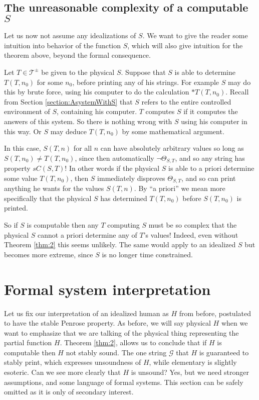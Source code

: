 \documentclass{amsart}  %
\numberwithin{equation}{section}
\theoremstyle{definition}
\theoremstyle{remark}
\begin{document}
{\subsection{The unreasonable complexity of a computable $S$} Let us now not assume any idealizations of $S$. We want to give the reader some intuition into behavior of the function $S$, which will also give 
intuition for the theorem above, beyond the formal consequence. 

Let $T \in \mathcal{T} ^{\pm} $ be given to the physical $S$. Suppose that  $S$ is able to determine $T (T,n _{0} )$ for some $n _{0} $, before printing any of his strings. For example $S$ may do this by brute force, using his computer to do the calculation $*T (T,n _{0} )$. Recall from Section \ref{section:AsystemWithS} that $S$ refers to the entire controlled environment of $S$, containing his computer. $T$ computes $S$ if it computes the answers of this system. So there is nothing wrong with $S$ using his computer in this way. Or $S$ may deduce $T (T,n _{0} )$ by some mathematical argument.

In this case, $S (T,n)$ for all $n$ can have absolutely arbitrary values so long as $S (T,n _{0} ) \neq T (T,n _{0} )$, since then automatically $\neg \Theta _{S,T} $, and so any string has property $sC (S,T)$! In other words if the physical $S$ is able to a priori determine some value $T (T, n _{0} )$, then $S$ immediately disproves $\Theta _{S,T} $, and so can print anything he wants for the values $S (T,n)$. By ``a priori'' we mean more specifically that the physical $S$ has determined $T (T, n _{0})$ before $S (T, n _{0} )$ is printed. 

So if $S$ is computable then any $T$ computing $S$ must be so complex that the physical $S$ cannot a priori determine any of $T$'s values!
Indeed, even without Theorem \ref{thm:2} this seems unlikely. 
The same would apply to an idealized $S$ but becomes more extreme, since $S$ is no longer time constrained.
\section {Formal system interpretation} \label{section:formalsystem}
Let us fix our interpretation of an idealized human as $H$ from before, postulated to have the stable Penrose property. As before, we will say physical $H$ when we want to emphasize that we are talking of the physical thing representing the partial function $H$. Theorem \ref{thm:2}, allows us to conclude that if $H$ is computable then $H$ not stably sound. The one string $\mathcal{G}$ that $H$ is guaranteed to stably print, which expresses unsoundness of $H$, while elementary is slightly esoteric. Can we see more clearly that $H$ is unsound? Yes, but we need stronger assumptions, and some language of formal systems. This section can be safely omitted as it is only of secondary interest.

}
\end{document}
